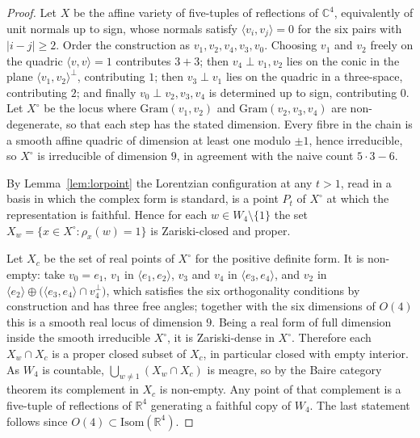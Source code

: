 \documentclass[11pt]{article}
\theoremstyle{definition}
\theoremstyle{remark}
\theoremstyle{definition}
\newcommand{\R}{\mathbb{R}}
\newcommand{\C}{\mathbb{C}}
\begin{document}
\begin{proof}
Let $X$ be the affine variety of five-tuples of reflections of $\C^4$, equivalently of unit
normals up to sign, whose normals satisfy $\langle v_i,v_j\rangle=0$ for the six pairs with
$|i-j|\ge2$. Order the construction as $v_1,v_2,v_4,v_3,v_0$. Choosing $v_1$ and $v_2$ freely on
the quadric $\langle v,v\rangle=1$ contributes $3+3$; then $v_4\perp v_1,v_2$ lies on the conic in
the plane $\langle v_1,v_2\rangle^{\perp}$, contributing $1$; then $v_3\perp v_1$ lies on the
quadric in a three-space, contributing $2$; and finally $v_0\perp v_2,v_3,v_4$ is determined up to
sign, contributing $0$. Let $X^{\circ}$ be the locus where $\mathrm{Gram}(v_1,v_2)$ and
$\mathrm{Gram}(v_2,v_3,v_4)$ are non-degenerate, so that each step has the stated dimension. Every
fibre in the chain is a smooth affine quadric of dimension at least one modulo $\pm1$, hence
irreducible, so $X^{\circ}$ is irreducible of dimension $9$, in agreement with the naive count
$5\cdot3-6$.

By Lemma~\ref{lem:lorpoint} the Lorentzian configuration at any $t>1$, read in a basis in which
the complex form is standard, is a point $P_t$ of $X^{\circ}$ at which the representation is
faithful. Hence for each $w\in W_4\setminus\{1\}$ the set
$X_w=\{x\in X^{\circ}:\rho_x(w)=1\}$ is Zariski-closed and proper.

Let $X_c$ be the set of real points of $X^{\circ}$ for the positive definite form. It is
non-empty: take $v_0=e_1$, $v_1$ in $\langle e_1,e_2\rangle$, $v_3$ and $v_4$ in
$\langle e_3,e_4\rangle$, and $v_2$ in $\langle e_2\rangle\oplus\bigl(\langle
e_3,e_4\rangle\cap v_4^{\perp}\bigr)$, which satisfies the six orthogonality conditions by
construction and has three free angles; together with the six dimensions of $O(4)$ this is a
smooth real locus of dimension $9$. Being a real form of full dimension inside the smooth
irreducible $X^{\circ}$, it is Zariski-dense in $X^{\circ}$. Therefore each $X_w\cap X_c$ is a
proper closed subset of $X_c$, in particular closed with empty interior. As $W_4$ is countable,
$\bigcup_{w\neq1}(X_w\cap X_c)$ is meagre, so by the Baire category theorem its complement in
$X_c$ is non-empty. Any point of that complement is a five-tuple of reflections of $\R^4$
generating a faithful copy of $W_4$. The last statement follows since $O(4)\subset
\mathrm{Isom}(\R^4)$.
\end{proof}
\end{document}
